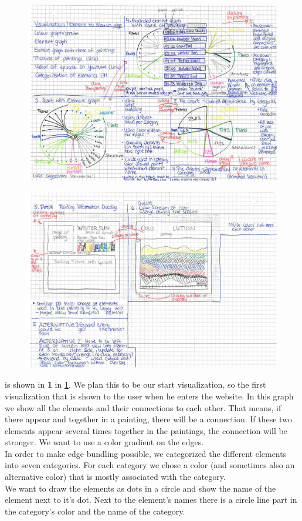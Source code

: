 \documentclass[a4paper]{tufte-book}
\newcommand{\quo}[1]{\flqq{#1}\frqq}
\begin{document}
\begin{figure}
	\includegraphics{Images/concept1.jpg}
	\caption{}
	\label{fig:concept1}
\end{figure}

\begin{figure}
	\includegraphics{Images/concept2.jpg}
	\caption{}
	\label{fig:concept2}
\end{figure}

 is shown in \textbf{1} in \ref{fig:concept1}. We plan this to be our start visualization, so the first visualization that is shown to the user when he enters the website. In this graph we show all the elements and their connections to each other. That means, if there appear \quo{fog} and \quo{boat} together in a painting, there will be a connection. If these two elements appear several times together in the paintings, the connection will be stronger. We want to use a color gradient on the edges.\\
In order to make edge bundling possible, we categorized the different elements into seven categories. For each category we chose a color (and sometimes also an alternative color) that is mostly associated with the category. \\
We want to draw the elements as dots in a circle and show the name of the element next to it's dot. Next to the element's names there is a circle line part in the category's color and the name of the category. 
\end{document}
